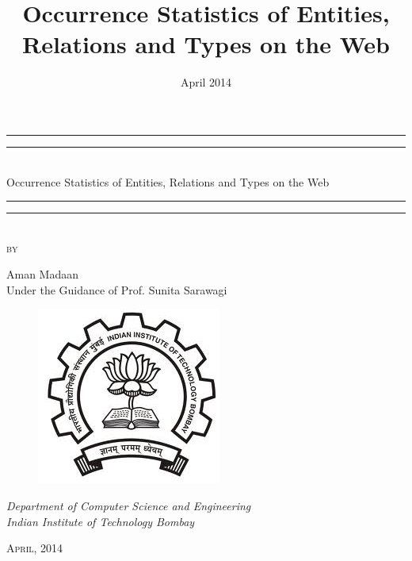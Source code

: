 \documentclass[DIV=calc, paper=a4, fontsize=11pt, twocolumn]{article}
\title{Occurrence Statistics of Entities, Relations and Types on the Web} %
\date{April 2014} %
\begin{document}
\begin{titlepage}
    \centering
    \vspace*{\baselineskip}
    \rule{\textwidth}{1.6pt}\vspace*{-\baselineskip}\vspace*{2pt}
    \rule{\textwidth}{0.4pt}\\[\baselineskip]
    {\LARGE \color{DarkBlue} Occurrence Statistics of Entities, Relations and Types on the Web}\\[0.2\baselineskip]
    \rule{ \textwidth}{0.4pt}\vspace*{-\baselineskip}\vspace{3.2pt}
    \rule{\textwidth}{1.6pt}\\[\baselineskip]
    \scshape
    \vspace*{1\baselineskip}
     by \\[\baselineskip]
    {\Large  Aman Madaan \vspace*{1\baselineskip} \\ Under the Guidance of Prof. Sunita Sarawagi\par}
       \begin{figure}[h]
 \centering
 \vspace*{13\baselineskip}
 \includegraphics[bb=0 0 229 220,scale=0.35]{./iitb_logo.jpg}
\end{figure}

    {\vspace*{1\baselineskip}  \itshape Department of Computer Science and Engineering \\ Indian Institute of Technology Bombay\par}
    \vfill
 
    {\scshape April, 2014} \\
    {\large }\par
  \end{titlepage}
  
\end{document}
